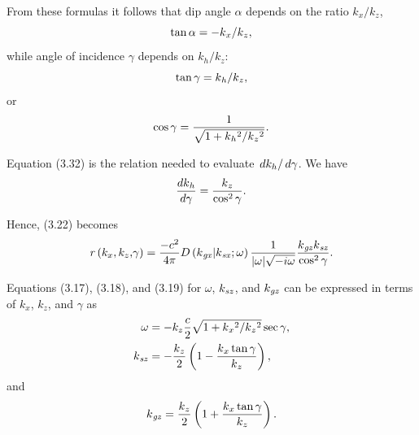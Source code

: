 From these formulas it follows that dip angle $\alpha $ depends on the ratio \(k_x/k_z\),
\begin{equation}\tan  \alpha  = -\text{\textit{$ $}}\text{\textit{$k$}}_{\text{\textit{$x$}}}/\text{\textit{$k$}}_{\text{\textit{$z$}}},\end{equation}
while angle of incidence $\gamma $ depends on \(k_h/k_z\):
\begin{equation}\tan  \gamma  =\text{\textit{$ $}}\text{\textit{$k$}}_{\text{\textit{$h$}}}/\text{\textit{$k$}}_{\text{\textit{$z$}}},\end{equation}
or
\begin{equation}\cos  \gamma  =\frac{1}{\sqrt{1+\text{\textit{$k$}}_{\text{\textit{$h$}}}{}^2/\text{\textit{$k$}}_{\text{\textit{$z$}}}{}^2}}.\end{equation}

Equation (3.32) is the relation needed to evaluate \(\left.dk_h\right/d\gamma \). We have
\begin{equation}\frac{d\text{\textit{$k$}}_{\text{\textit{$h$}}}}{d \gamma } = \text{\textit{$ $}}\frac{\text{\textit{$k$}}_{\text{\textit{$z$}}}}{\cos
 ^2\gamma }.\end{equation}

Hence, (3.22) becomes
\begin{equation}\text{\textit{$\mathit{r}$}}\left(\text{\textit{$k_x$}},\text{\textit{$k_z$}}\text{\textit{$,$}}\gamma \right) =\frac{-\text{\textit{$c$}}^2}{4\pi
} \text{\textit{$D$}}\left(\text{\textit{$k$}}_{\text{\textit{gx}}}|\text{\textit{$k$}}_{\text{\textit{sx}}};\omega \right) \frac{1}{|\omega |\sqrt{-i
\omega }}\frac{\text{\textit{$k$}}_{\text{\textit{gz}}}\text{\textit{$k$}}_{\text{\textit{sz}}}}{ \cos  ^2\gamma } .\end{equation}

Equations (3.17), (3.18), and (3.19) for $\omega $, \(k_{\text{\textit{sz}}}\), and \(k_{\text{\textit{gz}}}\) can be expressed in terms of
\(k_x\), \(k_z\), and $\gamma $ as
\begin{align}\omega &=-\text{\textit{$k_z$}}\frac{\text{\textit{$c$}}}{2}\sqrt{1+\text{\textit{$k$}}_{\text{\textit{$x$}}}{}^2/\text{\textit{$k$}}_{\text{\textit{$z$}}}{}^2}
\sec  \gamma ,\\
\text{\textit{$k$}}_{\text{\textit{sz}}}&=-\frac{\text{\textit{$k$}}_{\text{\textit{$z$}}}}{2} \left(1-\frac{\text{\textit{$k$}}_{\text{\textit{$x$}}}\tan
 \gamma }{\text{\textit{$k$}}_{\text{\textit{$z$}}}}\right),\end{align}
and
\begin{equation}\text{\textit{$k$}}_{\text{\textit{gz}}}=\frac{\text{\textit{$k$}}_{\text{\textit{$z$}}}}{2} \left(1+\frac{\text{\textit{$k$}}_{\text{\textit{$x$}}}\tan
 \gamma }{\text{\textit{$k$}}_{\text{\textit{$z$}}}}\right) .\end{equation}

